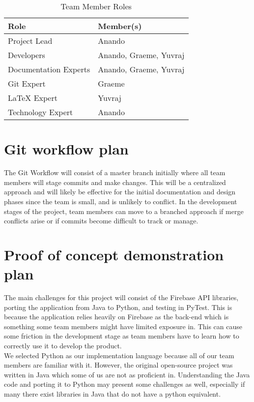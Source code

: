 \documentclass[12pt, titlepage]{article}
\begin{document}
\begin{table}[H]
    \centering
    \caption{Team Member Roles}
    \vspace{5pt}
    \begin{tabular}{|l|l|}
        \hline
        \textbf{Role} & \textbf{Member(s)} \\
        \hline
        Project Lead & Anando\\
        \hline
        Developers & Anando, Graeme, Yuvraj \\
        \hline
        Documentation Experts &  Anando, Graeme, Yuvraj\\
        \hline
        Git Expert & Graeme \\
        \hline
        LaTeX Expert & Yuvraj \\
        \hline
        Technology Expert &  Anando \\
        \hline
    \end{tabular}
\end{table}

\section{Git workflow plan}
The Git Workflow will consist of a master branch initially where all team members will stage commits and make changes. This will be a centralized approach and will likely be effective for the initial documentation and design phases since the team is small, and is unlikely to conflict. In the development stages of the project, team members can move to a branched approach if merge conflicts arise or if commits become difficult to track or manage.


\section{Proof of concept demonstration plan}

The main challenges for this project will consist of the Firebase API libraries, porting the application from Java to Python, and testing in PyTest. This is because the application relies heavily on Firebase as the back-end which is something some team members might have limited exposure in. This can cause some friction in the development stage as team members have to learn how to correctly use it to develop the product. \\

We selected Python as our implementation language because all of our team members are familiar with it. However, the original open-source project was written in Java which some of us are not as proficient in. Understanding the Java code and porting it to Python may present some challenges as well, especially if many there exist libraries in Java that do not have a python equivalent.\\
\end{document}
